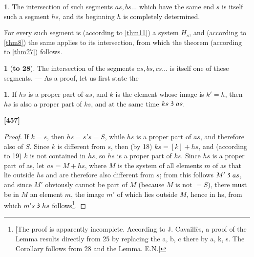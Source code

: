 \documentclass[leqno,hidelinks,a4paper]{article}
\theoremstyle{definition}
\newtheorem{satz}{\protect\satzname}
\newtheorem*{zusatz}{\protect\zusatzname}
\newtheorem*{hilfssatz}{\protect\hilfssatzname}
\newcommand{\satzname}{}
\newcommand{\zusatzname}{}
\newcommand{\hilfssatzname}{}
\renewcommand{\satzname}{\hspace{-4pt}.\ Satz}%
\renewcommand{\zusatzname}{Zusatz}%
\renewcommand{\hilfssatzname}{Hilfssatz}%
\renewcommand{\satzname}{\hspace{-4pt}.\ Theorem}%
\renewcommand{\zusatzname}{Corollary}%
\renewcommand{\hilfssatzname}{Lemma}%
\newcommand\partof{\mathrel{\raisebox{0.45ex}{$\mathfrak{3}$}}}
\begin{document}
\begin{satz}\label{thm28}
The intersection of such segments $as, bs\ldots$ which have the same end $s$ is itself such a segment $hs$, and its beginning $h$ is completely determined.
\end{satz}

For every such segment is (according to \ref{thm11}) a system $H_s$, and (according to \ref{thm8}) the same applies to its intersection, from which the theorem (according to \ref{thm27}) follows.

\begin{zusatz}[\textbf{to 28}]
\label{cor_to_thm28}
The intersection of the segments $as, bs, cs \ldots$ is itself one of these segments. --- As a proof, let us first state the
\end{zusatz}

\begin{hilfssatz}
If $hs$ is a proper part of $as$, and $k$ is the element whose image is $k'=h$, then $hs$ is also a proper part of $ks$, and at the same time $ks \partof as$.
\end{hilfssatz}
\noindent \textbf{[457]}

\begin{proof}
If $k=s$, then $hs=s's= S$, while $hs$ is a proper part of $as$, and therefore also of $S$. Since $k$ is different from $s$, then (by 18) $ks =[k]+ hs$, and (according to 19) $k$ is not contained in $hs$, so $hs$ is a proper part of $ks$.
Since $hs$ is a proper part of as, let $as = M + hs$, where $M$ is the system of all elements $m$ of as that lie outside $hs$ and are therefore also different from $s$; from this follows $M' \partof as$, and since $M'$ obviously cannot be part of $M$ (because $M$ is not $= S$), there must be in $M$ an element $m$, the image $m'$ of which lies outside $M$, hence in hs, from which $m's \partof hs$ follows\footnote{[The proof is apparently incomplete. According to J. Cavaillès, a proof of the Lemma results directly from 25 by replacing the a, b, c there by a, k, s. The Corollary follows from 28 and the Lemma. E.N.]}.\end{proof}
\end{document}
